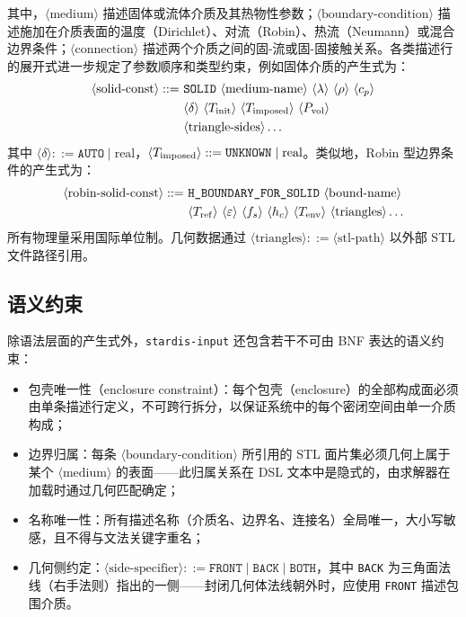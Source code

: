 其中，$\langle\text{medium}\rangle$ 描述固体或流体介质及其热物性参数；$\langle\text{boundary-condition}\rangle$ 描述施加在介质表面的温度（Dirichlet）、对流（Robin）、热流（Neumann）或混合边界条件；$\langle\text{connection}\rangle$ 描述两个介质之间的固-流或固-固接触关系。各类描述行的展开式进一步规定了参数顺序和类型约束，例如固体介质的产生式为：
%
\begin{equation}
\begin{aligned}
\langle\text{solid-const}\rangle ::=\ &\texttt{SOLID}\ \langle\text{medium-name}\rangle\ \langle\lambda\rangle\ \langle\rho\rangle\ \langle c_p\rangle \\
  &\langle\delta\rangle\ \langle T_{\rm init}\rangle\ \langle T_{\rm imposed}\rangle\ \langle P_{\rm vol}\rangle \\
  &\langle\text{triangle-sides}\rangle\ldots
\end{aligned}
\label{eq:gui:bnf-solid}
\end{equation}
%
其中 $\langle\delta\rangle ::= \texttt{AUTO} \mid \text{real}$，$\langle T_{\rm imposed}\rangle ::= \texttt{UNKNOWN} \mid \text{real}$。类似地，Robin 型边界条件的产生式为：
%
\begin{equation}
\begin{aligned}
\langle\text{robin-solid-const}\rangle ::=\ &\texttt{H\_BOUNDARY\_FOR\_SOLID}\ \langle\text{bound-name}\rangle \\
  &\langle T_{\rm ref}\rangle\ \langle\varepsilon\rangle\ \langle f_s\rangle\ \langle h_c\rangle\ \langle T_{\rm env}\rangle\ \langle\text{triangles}\rangle\ldots
\end{aligned}
\label{eq:gui:bnf-robin}
\end{equation}
%
所有物理量采用国际单位制。几何数据通过 $\langle\text{triangles}\rangle ::= \langle\text{stl-path}\rangle$ 以外部 STL 文件路径引用。

\subsection{语义约束}

除语法层面的产生式外，\texttt{stardis-input} 还包含若干不可由 BNF 表达的语义约束：
\begin{itemize}
  \item 包壳唯一性（enclosure constraint）：每个包壳（enclosure）的全部构成面必须由单条描述行定义，不可跨行拆分，以保证系统中的每个密闭空间由单一介质构成；
  \item 边界归属：每条 $\langle\text{boundary-condition}\rangle$ 所引用的 STL 面片集必须几何上属于某个 $\langle\text{medium}\rangle$ 的表面——此归属关系在 DSL 文本中是隐式的，由求解器在加载时通过几何匹配确定；
  \item 名称唯一性：所有描述名称（介质名、边界名、连接名）全局唯一，大小写敏感，且不得与文法关键字重名；
  \item 几何侧约定：$\langle\text{side-specifier}\rangle ::= \texttt{FRONT} \mid \texttt{BACK} \mid \texttt{BOTH}$，其中 \texttt{BACK} 为三角面法线（右手法则）指出的一侧——封闭几何体法线朝外时，应使用 \texttt{FRONT} 描述包围介质。
\end{itemize}

